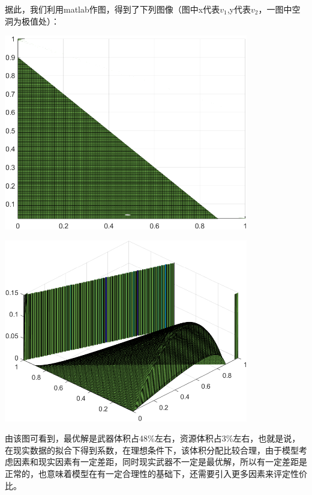 \documentclass[UTF8]{mcmthesis}
\begin{document}
据此，我们利用matlab作图，得到了下列图像（图中x代表$v_1$,y代表$v_2$，一图中空洞为极值处）：
\begin{center} 
\includegraphics[width=0.8\textwidth]{A2.png} 
\end{center}
\begin{center} 
\includegraphics[width=0.8\textwidth]{A1.png} 
\end{center}
由该图可看到，最优解是武器体积占48\%左右，资源体积占3\%左右，也就是说，在现实数据的拟合下得到系数，在理想条件下，该体积分配比较合理，由于模型考虑因素和现实因素有一定差距，同时现实武器不一定是最优解，所以有一定差距是正常的，也意味着模型在有一定合理性的基础下，还需要引入更多因素来评定性价比。
\end{document}
